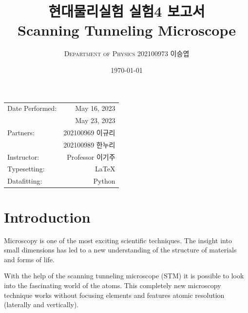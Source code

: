 \documentclass[a4paper, 10pt, nanum]{CSUniSchoolLabReport}
\title{현대물리실험 실험4 보고서 \\ Scanning Tunneling Microscope} %
\author{\textsc{Department of Physics} 202100973 이승엽}
\date{\today}
\begin{document}
\maketitle %

\begin{center}
	\begin{tabular}{l r}
		Date Performed: & May 16, 2023 \\ %
		& May 23, 2023 \\
		Partners: & 202100969 이규리 \\ %
		& 202100989 한누리 \\
		Instructor: & Professor 이기주 \\ %
		Typesetting: & LaTeX \\
		Datafitting: & Python \\
	\end{tabular}
\end{center}


\maketitle


\section{Introduction}

	Microscopy is one of the most exciting scientific techniques. The insight into small dimensions has led to a new understanding of the structure of materials and forms of life.

	With the help of the scanning tunneling microscope (STM) it is possible to look into the fascinating world of the atoms. This completely new microscopy technique works without focusing elements and features atomic resolution (laterally and vertically).
\end{document}
